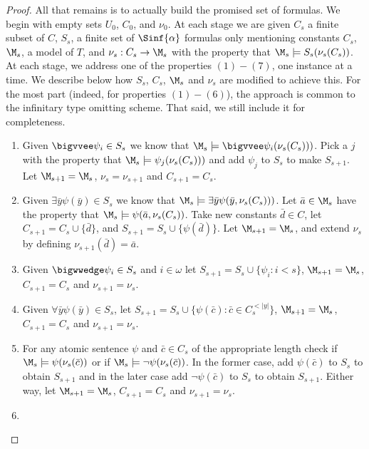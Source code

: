 \documentclass[10pt,a4paper]{amsart}
\renewcommand{\-}{\text{-}}
\begin{document}
\begin{proof}
		All that remains is to actually build the promised set of formulas.
		We begin with empty sets $U_0$, $C_0$, and $\nu_0$.
		At each stage we are given $C_s$ a finite subset of $C$, $S_s$, a finite set of  $\Sinf{\alpha}$ formulas only mentioning constants $C_s$, $\M_s$, a model of $T$, and $\nu_s:C_s\to \M_s$ with the property that $\M_s\models S_s(\nu_s(C_s))$.
		At each stage, we address one of the properties $(1)-(7)$, one instance at a time.
		We describe below how $S_s$, $C_s$, $\M_s$ and $\nu_s$ are modified to achieve this.
		For the most part (indeed, for properties $(1)-(6)$), the approach is common to the infinitary type omitting scheme.
		That said, we still include it for completeness.
		
    \begin{enumerate}[align=left,leftmargin=\parindent]
      \item[Property $(1)$]
			Given $\bigvvee \psi_i \in S_s$ we know that $\M_s\models \bigvvee \psi_i (\nu_s(C_s)))$. 
			Pick a $j$ with the property that $\M_s\models \psi_j (\nu_s(C_s)))$ and add $\psi_j$ to $S_s$ to make $S_{s+1}$.
			Let $\M_{s+1}=\M_s$, $\nu_s=\nu_{s+1}$ and $C_{s+1}=C_s$.
			\item[Property $(2)$]
			Given $\exists \bar y \psi(\bar y) \in S_s$ we know that  $\M_s\models  \exists \bar y\psi (\bar{y}, \nu_s(C_s)))$.
			Let $\bar{a}\in\M_s$ have the property that $\M_s\models \psi(\bar{a},\nu_s(C_s))$.
			Take new constants $\bar{d}\in C$, let $C_{s+1}=C_s\cup\{\bar{d}\}$, and $S_{s+1}= S_s\cup\{\psi(\bar{d})\}$.
			Let $\M_{s+1}=\M_s$, and extend $\nu_s$ by defining $\nu_{s+1}(\bar{d})=\bar{a}$.
			\item[Property $(3)$]
			Given $\bigwwedge \psi_i \in S_s$ and $i\in\omega$ let $S_{s+1}=S_s\cup\{\psi_i:i<s\}$, $\M_{s+1}=\M_s$, $C_{s+1}=C_s$ and $\nu_{s+1}=\nu_s$.
			\item[Property $(4)$]
        Given $\forall \bar y \psi(\bar y) \in S_s$, let $S_{s+1}=S_s\cup\{\psi(\bar c): \bar c\in C_s^{<|y|}\}$, $\M_{s+1}=\M_s$, $C_{s+1}=C_s$ and $\nu_{s+1}=\nu_s$.
			\item[Property $(5)$]
			For any atomic sentence $\psi$ and $\bar{c}\in C_s$ of the appropriate length check if $\M_s\models \psi(\nu_s(\bar{c}))$ or if $\M_s\models \lnot\psi(\nu_s(\bar{c}))$.
			In the former case, add $\psi(\bar{c})$ to $S_s$ to obtain $S_{s+1}$ and in the later case  add $\lnot\psi(\bar{c})$ to $S_s$ to obtain $S_{s+1}$.
			Either way, let $\M_{s+1}=\M_s$, $C_{s+1}=C_s$ and $\nu_{s+1}=\nu_s$.
			\item[Property $(6)$]

\end{enumerate}
\end{proof}
\end{document}
